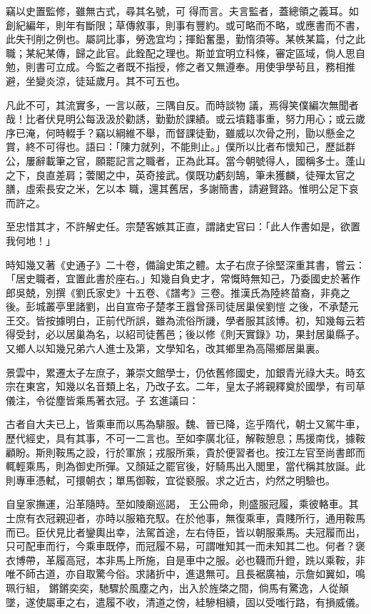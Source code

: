 \begin{pinyinscope}
 竊以史置監修，雖無古式，尋其名號，可
 得而言。夫言監者，蓋總領之義耳。如創紀編年，則年有斷限；草傳敘事，則事有豐約。或可略而不略，或應書而不書，此失刊削之例也。屬詞比事，勞逸宜均；揮鉛奮墨，勤惰須等。某帙某篇，付之此職；某紀某傳，歸之此官。此銓配之理也。斯並宜明立科條，審定區域，倘人思自勉，則書可立成。今監之者既不指授，修之者又無遵奉。用使爭學茍且，務相推避，坐變炎涼，徒延歲月。其不可五也。



 凡此不可，其流實多，一言以蔽，三隅自反。而時談物
 議，焉得笑僕編次無聞者哉！比者伏見明公每汲汲於勸誘，勤勤於課績。或云墳籍事重，努力用心；或云歲序已淹，何時輟手？竊以綱維不舉，而督課徒勤，雖威以次骨之刑，勖以懸金之賞，終不可得也。語曰：「陳力就列，不能則止。」僕所以比者布懷知己，歷詆群公，屢辭載筆之官，願罷記言之職者，正為此耳。當今朝號得人，國稱多士。蓬山之下，良直差肩；蕓閣之中，英奇接武。僕既功虧刻鵠，筆未獲麟，徒殫太官之膳，虛索長安之米，乞以本
 職，還其舊居，多謝簡書，請避賢路。惟明公足下哀而許之。



 至忠惜其才，不許解史任。宗楚客嫉其正直，謂諸史官曰：「此人作書如是，欲置我何地！」



 時知幾又著《史通子》二十卷，備論史策之體。太子右庶子徐堅深重其書，嘗云：「居史職者，宜置此書於座右。」知幾自負史才，常慨時無知己，乃委國史於著作郎吳兢，別撰《劉氏家史》十五卷、《譜考》三卷。推漢氏為陸終苗裔，非堯之後。彭城叢亭里諸劉，出自宣帝子楚孝王囂曾孫司徒居巢侯劉愷
 之後，不承楚元王交。皆按據明白，正前代所誤，雖為流俗所譏，學者服其該博。初，知幾每云若得受封，必以居巢為名，以紹司徒舊邑；後以修《則天實錄》功，果封居巢縣子。又鄉人以知幾兄弟六人進士及第，文學知名，改其鄉里為高陽鄉居巢裏。



 景雲中，累遷太子左庶子，兼崇文館學士，仍依舊修國史，加銀青光祿大夫。時玄宗在東宮，知幾以名音類上名，乃改子玄。二年，皇太子將親釋奠於國學，有司草儀注，令從塵皆乘馬著衣冠。子
 玄進議曰：



 古者自大夫已上，皆乘車而以馬為騑服。魏、晉已降，迄乎隋代，朝士又駕牛車，歷代經史，具有其事，不可一二言也。至如李廣北征，解鞍憩息；馬援南伐，據鞍顧盼。斯則鞍馬之設，行於軍旅；戎服所乘，貴於便習者也。按江左官至尚書郎而輒輕乘馬，則為御史所彈。又顏延之罷官後，好騎馬出入閭里，當代稱其放誕。此則專車憑軾，可擐朝衣；單馬御鞍，宜從褻服。求之近古，灼然之明驗也。



 自皇家撫運，沿革隨時。至如陵廟巡謁，
 王公冊命，則盛服冠履，乘彼輅車。其士庶有衣冠親迎者，亦時以服箱充馭。在於他事，無復乘車，貴賤所行，通用鞍馬而已。臣伏見比者鑾輿出幸，法駕首途，左右侍臣，皆以朝服乘馬。夫冠履而出，只可配車而行，今乘車既停，而冠履不易，可謂唯知其一而未知其二也。何者？褒衣博帶，革履高冠，本非馬上所施，自是車中之服。必也韈而升鐙，跣以乘鞍，非唯不師古道，亦自取驚今俗。求諸折中，進退無可。且長裾廣袖，示詹如翼如，鳴珮行組，
 鏘鏘奕奕，馳驟於風塵之內，出入於旌棨之間，倘馬有驚逸，人從顛墜，遂使屬車之右，遣履不收，清道之傍，絓驂相續，固以受嗤行路，有損威儀。




\end{pinyinscope}
